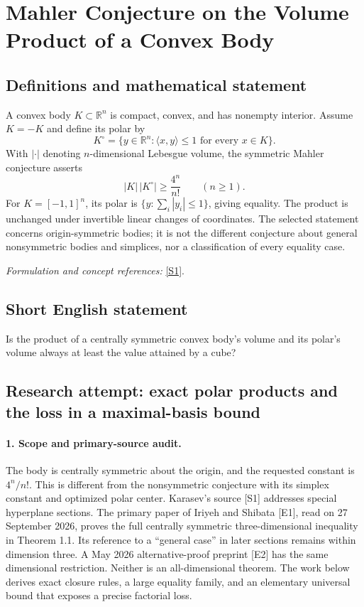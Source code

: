 \documentclass[11pt]{article}
\begin{document}
\section*{\texorpdfstring{Mahler Conjecture on the Volume Product of a Convex Body}{Mahler Conjecture on the Volume Product of a Convex Body}}\label{302}
\subsection{Definitions and mathematical statement}
A convex body $K\subset{\mathbb{R}}^n$ is compact, convex, and has nonempty interior. Assume $K=-K$ and define its polar by
\[
 K^\circ=\{y\in{\mathbb{R}}^n:\langle x,y\rangle\le1\text{ for every }x\in K\}.
\]
With $|\cdot|$ denoting $n$-dimensional Lebesgue volume, the symmetric Mahler conjecture asserts
\[
 |K|\,|K^\circ|\ge\frac{4^n}{n!}\qquad(n\ge1).
\]
For $K=[-1,1]^n$, its polar is $\{y:\sum_i|y_i|\le1\}$, giving equality. The product is unchanged under invertible linear changes of coordinates. The selected statement concerns origin-symmetric bodies; it is not the different conjecture about general nonsymmetric bodies and simplices, nor a classification of every equality case.
\par\smallskip\textit{Formulation and concept references:} \href{https://arxiv.org/pdf/1902.08971}{[S1]}.

\subsection{Short English statement}
Is the product of a centrally symmetric convex body's volume and its polar's volume always at least the value attained by a cube?
\subsection{Research attempt: exact polar products and the loss in a maximal-basis bound}
\paragraph{1. Scope and primary-source audit.}
The body is centrally symmetric about the origin, and the requested constant is $4^n/n!$. This is different from the nonsymmetric conjecture with its simplex constant and optimized polar center. Karasev's source [S1] addresses special hyperplane sections. The primary paper of Iriyeh and Shibata [E1], read on 27 September 2026, proves the full centrally symmetric three-dimensional inequality in Theorem 1.1. Its reference to a ``general case'' in later sections remains within dimension three. A May 2026 alternative-proof preprint [E2] has the same dimensional restriction. Neither is an all-dimensional theorem. The work below derives exact closure rules, a large equality family, and an elementary universal bound that exposes a precise factorial loss.
\end{document}
